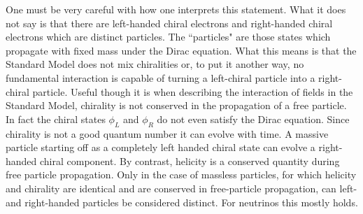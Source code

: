 One must be very careful with how one interprets this statement. What it does not say is that
there are left-handed chiral electrons and right-handed chiral electrons which are distinct particles. The ``particles" are those states which propagate with fixed mass under the Dirac equation. What this means is that the Standard Model does not mix chiralities or, to put it another way, no fundamental interaction is capable of turning a left-chiral particle into a right-chiral particle. Useful though it is when describing the interaction of fields in the Standard Model, chirality is not conserved in the propagation of a free particle. In fact the chiral states \(\phi _L\) and \(\phi_R\) do not even satisfy the Dirac equation. Since chirality is not a good quantum number it can evolve with time. A massive particle starting off as a completely left handed chiral state can evolve a right-handed chiral component. By contrast, helicity is a conserved quantity during free particle propagation. Only in the case of massless particles, for which helicity and chirality are identical and are conserved in free-particle propagation, can left- and right-handed particles be considered distinct. For neutrinos this mostly holds.